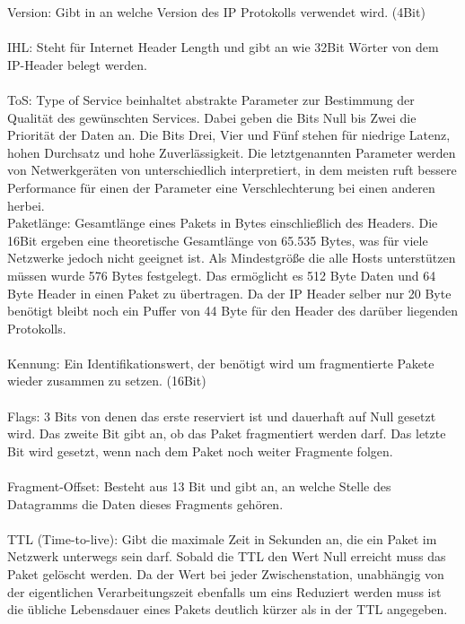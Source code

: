 Version: Gibt in an welche Version des IP Protokolls verwendet wird. (4Bit) \\\\
IHL: Steht für Internet Header Length und gibt an wie 32Bit Wörter von dem IP-Header belegt werden.\\\\
ToS: Type of Service beinhaltet abstrakte Parameter zur Bestimmung der Qualität des gewünschten Services. Dabei geben die Bits Null bis Zwei die Priorität der Daten an. Die Bits Drei, Vier und Fünf stehen für niedrige Latenz, hohen Durchsatz und hohe Zuverlässigkeit. Die letztgenannten Parameter werden von Netwerkgeräten von unterschiedlich interpretiert, in dem meisten ruft bessere Performance für einen der Parameter eine Verschlechterung bei einen anderen herbei.\\
Paketlänge: Gesamtlänge eines Pakets in Bytes einschließlich des Headers. Die 16Bit ergeben eine theoretische Gesamtlänge von 65.535 Bytes, was für viele Netzwerke jedoch nicht geeignet ist. Als Mindestgröße die alle Hosts unterstützen müssen wurde 576 Bytes festgelegt. Das ermöglicht es 512 Byte Daten und 64 Byte Header in einen Paket zu übertragen. Da der IP Header selber nur 20 Byte benötigt bleibt noch ein Puffer von 44 Byte für den Header des darüber liegenden Protokolls.  \\\\
Kennung: Ein Identifikationswert, der benötigt wird um fragmentierte Pakete wieder zusammen zu setzen.  (16Bit)  \\\\
Flags: 3 Bits von denen das erste reserviert ist und dauerhaft auf Null gesetzt wird. Das zweite Bit gibt an, ob das Paket fragmentiert werden darf. Das letzte Bit wird gesetzt, wenn nach dem Paket noch weiter Fragmente folgen. \\\\
Fragment-Offset: Besteht aus 13 Bit und gibt an, an welche Stelle des Datagramms die Daten dieses Fragments gehören. \\\\
TTL (Time-to-live): Gibt die maximale Zeit in Sekunden an, die ein Paket im Netzwerk unterwegs sein darf. Sobald die TTL den Wert Null erreicht muss das Paket gelöscht werden. Da der Wert bei jeder Zwischenstation, unabhängig von der eigentlichen Verarbeitungszeit ebenfalls um eins Reduziert werden muss ist die übliche Lebensdauer eines Pakets deutlich kürzer als in der TTL angegeben. \\\\
